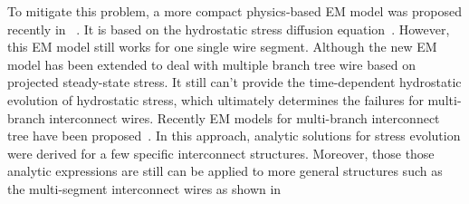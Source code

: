 To mitigate this problem, a more compact physics-based EM model was
proposed recently in ~\cite{HuangYu:DAC'14}. It is based on the
hydrostatic stress diffusion
equation~\cite{Korhonen:jap1993}. However, this EM model still works
for one single wire segment. Although the new EM model has been
extended to deal with multiple branch tree wire based on projected
steady-state stress.  It still can't provide the time-dependent
hydrostatic evolution of hydrostatic stress, which ultimately
determines the failures for multi-branch interconnect wires.  Recently
EM models for multi-branch interconnect tree have been
proposed~\cite{ChenHuang:DAC'15,ChenTan:TCAD'16}. In this approach,
analytic solutions for stress evolution were derived for a few
specific interconnect structures. Moreover, those those analytic
expressions are still can be applied to more general structures such
as the multi-segment interconnect wires as shown in






